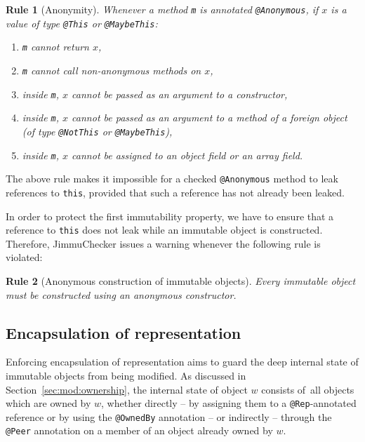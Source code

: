 \documentclass{pracamgr}
\theoremstyle{break}
\theoremstyle{break}
\theoremstyle{break}
\newtheorem{verrule}{Rule}
\begin{document}
\begin{verrule}[Anonymity] \label{vrl:anon}
  Whenever a method \texttt{m} is annotated \texttt{@Anonymous}, if
  $x$ is a value of type \texttt{@This} or \texttt{@MaybeThis}:
  \begin{enumerate}[label=(\arabic*)]
  \item \label{pnt:anon-ret} \texttt{m} cannot return $x$, 
  \item \texttt{m} cannot call non-anonymous methods on $x$, 
  \item inside \texttt{m}, $x$ cannot be passed as an argument to a constructor, 
  \item inside \texttt{m}, $x$ cannot be passed as an argument to a
    method of a foreign object (of type \texttt{@NotThis} or
    \texttt{@MaybeThis}),
  \item inside \texttt{m}, $x$ cannot be assigned to an object field
    or an array field.
  \end{enumerate}
\end{verrule}

The above rule makes it impossible for a checked \texttt{@Anonymous}
method to leak references to \texttt{this}, provided that such a
reference has not already been leaked.

In order to protect the first immutability property, we have to ensure
that a reference to \texttt{this} does not leak while an immutable
object is constructed. Therefore, JimmuChecker issues a warning
whenever the following rule is violated:
\begin{verrule}[Anonymous construction of immutable objects]
  Every immutable object must be constructed using an anonymous
  constructor.
\end{verrule}


\subsection{Encapsulation of representation}
\label{sec:chk:rep}

Enforcing encapsulation of representation aims to guard the deep
internal state of immutable objects from being modified. As discussed
in Section~\ref{sec:mod:ownership}, the internal state of object $w$
consists of~all objects which are owned by $w$, whether directly -- by
assigning them to a \texttt{@Rep}-annotated reference or by using the
\texttt{@OwnedBy} annotation -- or indirectly -- through the
\texttt{@Peer} annotation on a member of an object already owned by
$w$.
\end{document}
